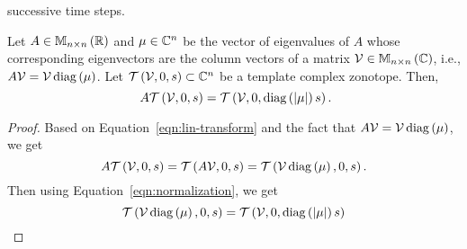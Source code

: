 successive time steps.
%
\begin{lemma}
Let $A\in\mathbb{M}_{n\times n}\left(\mathbb{R}\right)$ and $\mu\in\mathbb{C}^n$ be the vector of
eigenvalues of $A$ whose corresponding eigenvectors are the column
vectors of a matrix $\mathcal{V}\in\mathbb{M}_{n\times n}\left(\mathbb{C}\right)$, i.e.,
$A\mathcal{V}=\mathcal{V}\operatorname{diag}\left(\mu\right)$.  Let
$\mathit{\mathcal{T}}\left(\mathcal{V},0,s\right)\subset\mathbb{C}^n$ be a template complex
zonotope.  Then,
%
\begin{equation}~\label{eqn:eigen-scaling}
A\mathit{\mathcal{T}}\left(\mathcal{V},0,s\right)=\mathit{\mathcal{T}}\left(\mathcal{V},0,\operatorname{diag}\left(\left|\mu\right|\right)s\right).
\end{equation}
%
\end{lemma}
%
\begin{proof}
Based on Equation~\ref{eqn:lin-transform} and the fact that
$A\mathcal{V}=\mathcal{V}\operatorname{diag}\left(\mu\right)$, we get
%
\[
A\mathit{\mathcal{T}}\left(\mathcal{V},0,s\right)=\mathit{\mathcal{T}}\left(A\mathcal{V},0,s\right)=\mathit{\mathcal{T}}\left(\mathcal{V}\operatorname{diag}\left(\mu\right),0,s\right).
\]
%
Then using Equation~\ref{eqn:normalization}, we get
%
\[
\mathit{\mathcal{T}}\left(\mathcal{V}\operatorname{diag}\left(\mu\right),0,s\right)=\mathit{\mathcal{T}}\left(\mathcal{V},0,\operatorname{diag}\left(\left|\mu\right|\right)s\right)
\]
\end{proof}

